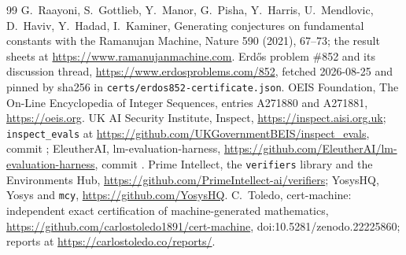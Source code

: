 \documentclass[11pt]{article}
\theoremstyle{definition}
\begin{document}
\begin{footnotesize}
\begin{thebibliography}{99}
 G.~Raayoni, S.~Gottlieb, Y.~Manor, G.~Pisha, Y.~Harris, U.~Mendlovic, D.~Haviv, Y.~Hadad, I.~Kaminer, Generating conjectures on fundamental constants with the Ramanujan Machine, Nature 590 (2021), 67--73; the result sheets at \url{https://www.ramanujanmachine.com}.
 Erd\H{o}s problem \#852 and its discussion thread, \url{https://www.erdosproblems.com/852}, fetched 2026-08-25 and pinned by sha256 in \texttt{certs/erdos852-certificate.json}.
 OEIS Foundation, The On-Line Encyclopedia of Integer Sequences, entries A271880 and A271881, \url{https://oeis.org}.
 UK AI Security Institute, Inspect, \url{https://inspect.aisi.org.uk}; \texttt{inspect\_evals} at \url{https://github.com/UKGovernmentBEIS/inspect_evals}, commit \InspectEvalsCommit; EleutherAI, lm-evaluation-harness, \url{https://github.com/EleutherAI/lm-evaluation-harness}, commit \LmEvalCommit.
 Prime Intellect, the \texttt{verifiers} library and the Environments Hub, \url{https://github.com/PrimeIntellect-ai/verifiers}; YosysHQ, Yosys and \texttt{mcy}, \url{https://github.com/YosysHQ}.
 C.~Toledo, cert-machine: independent exact certification of machine-generated mathematics, \url{https://github.com/carlostoledo1891/cert-machine}, doi:10.5281/zenodo.22225860; reports at \url{https://carlostoledo.co/reports/}.
\end{thebibliography}
\end{footnotesize}
\end{document}
